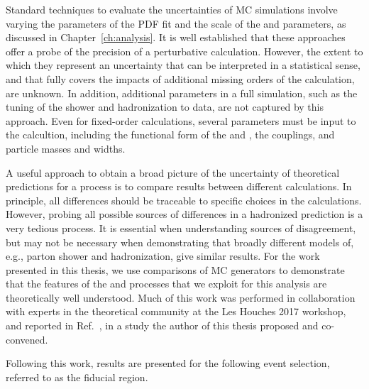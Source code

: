 Standard techniques to evaluate the uncertainties of MC simulations involve
varying the parameters of the PDF fit and the scale of the {\muF} and {\muR} parameters,
as discussed in Chapter~\ref{ch:analysis}. 
It is well established that these approaches offer a probe of the precision
of a perturbative calculation. However, the extent to which they represent
an uncertainty that can be interpreted in a statistical sense, and that fully
covers the impacts of additional missing orders of the calculation, are unknown.
In addition, additional parameters in a full simulation, such as the tuning
of the shower and hadronization to data, are not captured by this approach.
Even for fixed-order calculations, several parameters must be input to the calcultion,
including the functional form of the {\muF} and \muR, the couplings, and particle masses and
widths. 

A useful approach to obtain a broad picture of the uncertainty of theoretical
predictions for a process is to compare results between different calculations.
In principle, all differences should be traceable to specific choices in the calculations.
However, probing all possible sources of differences in a hadronized prediction is a very
tedious process. It is essential when understanding sources of disagreement, but
may not be necessary when demonstrating that broadly different models of, e.g., parton
shower and hadronization, give similar results.
For the work presented in this thesis, we use comparisons of MC generators to demonstrate that the 
features of the \EWWZ and \QCDWZ processes that we exploit for this analysis 
are theoretically well understood.
Much of this work was performed
in collaboration with experts in the theoretical community at the Les Houches 2017
workshop, and reported in Ref.~\cite{leshouches2017},
in a study the author of this thesis proposed and co-convened.

Following this work, results are presented for the following event selection,
referred to as the fiducial region.

